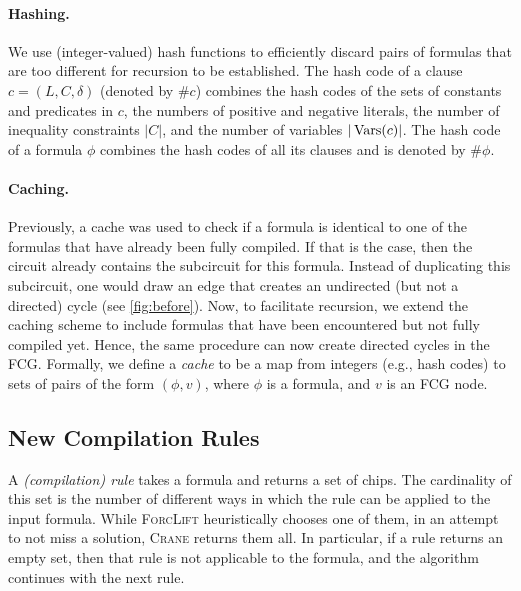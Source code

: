 \paragraph{Hashing.}
We use (integer-valued) hash functions to efficiently discard pairs of formulas
that are too different for recursion to be established. The hash code of a
clause $c = (L, C, \delta)$ (denoted by $\# c$) combines the hash codes of the
sets of constants and predicates in $c$, the numbers of positive and negative
literals, the number of inequality constraints $|C|$, and the number of
variables $|\operatorname{Vars}(c)|$. The hash code of a formula $\phi$ combines the hash
codes of all its clauses and is denoted by $\#\phi$.

\paragraph{Caching.}
Previously, a cache was used to check if a formula is identical to one of the
formulas that have already been fully compiled. If that is the case, then the
circuit already contains the subcircuit for this formula. Instead of duplicating
this subcircuit, one would draw an edge that creates an undirected (but not a
directed) cycle (see \cref{fig:before}). Now, to facilitate recursion, we extend
the caching scheme to include formulas that have been encountered but not fully
compiled yet. Hence, the same procedure can now create directed cycles in the
FCG\@. Formally, we define a \emph{cache} to be a map from integers (e.g., hash
codes) to sets of pairs of the form $(\phi, v)$, where $\phi$ is a formula, and
$v$ is an FCG node.



\subsection{New Compilation Rules}\label{sec:rules}

A \emph{(compilation) rule} takes a formula and returns a set of chips. The
cardinality of this set is the number of different ways in which the rule can be
applied to the input formula. While \textsc{ForcLift}
\citep{DBLP:conf/ijcai/BroeckTMDR11} heuristically chooses one of them, in an
attempt to not miss a solution, \textsc{Crane} returns them all. In particular,
if a rule returns an empty set, then that rule is not applicable to the formula,
and the algorithm continues with the next rule.

